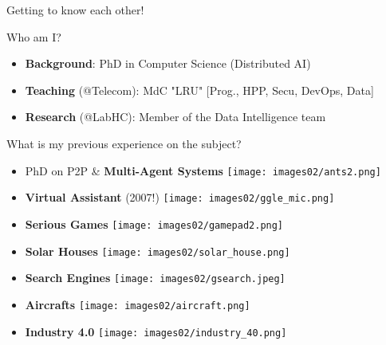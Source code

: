\documentclass[English,t,%
hyperref={%
    pdftitle={GM's Introduction},%
    pdfauthor={Guillaume Muller},%
    pdfsubject={GM's Introduction},%
    pdfkeywords={Presentation, Introduction}%
    },%
xcolor={pdftex,svgnames} %
]{beamer}
\begin{document}
\begin{frame}{Getting to know each other!}

\vspace{-.5cm}
%
  \begin{block}{Who am I?}
    { \footnotesize
      \begin{itemize}
        \item \textbf{Background}: PhD in Computer Science (Distributed AI)
        \item \textbf{Teaching} (@Telecom): MdC "LRU" [Prog., HPP, Secu, DevOps, Data]
        \item \textbf{Research} (@LabHC): Member of the Data Intelligence team
      \end{itemize}
    }
  \end{block}

  \begin{block}{What is my previous experience on the subject?}
    { \footnotesize
      \begin{itemize}
        \item PhD on P2P \& \textbf{Multi-Agent Systems} \hspace{1cm} \texttt{[image: images02/ants2.png]}\\[-2ex]
      \end{itemize}
      \begin{minipage}[c]{.45\linewidth}
        \begin{itemize}
          \item \textbf{Virtual Assistant} (2007!) \hfill \texttt{[image: images02/ggle\_mic.png]}    %
          \item \textbf{Serious Games}             \hfill \texttt{[image: images02/gamepad2.png]}    %
          \item \textbf{Solar Houses}              \hfill \texttt{[image: images02/solar\_house.png]} %
        \end{itemize}
      \end{minipage}
      \begin{minipage}[c]{.45\linewidth}
        \begin{itemize}
          \item \textbf{Search Engines} \hfill \texttt{[image: images02/gsearch.jpeg]}    %
          \item \textbf{Aircrafts}      \hfill \texttt{[image: images02/aircraft.png]}    %
          \item \textbf{Industry 4.0}   \hfill \texttt{[image: images02/industry\_40.png]} %
        \end{itemize}
      \end{minipage}
    }
  \end{block}


\end{frame}
\end{document}
